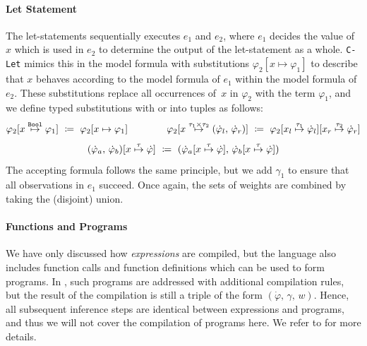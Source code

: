 \paragraph{Let Statement}
The let-statements sequentially executes $e_1$ and $e_2$, where $e_1$ decides the value of~$x$ which is used in $e_2$ to determine the output of the let-statement as a whole.
\texttt{C-Let} mimics this in the model formula with substitutions $\varphi_2[x\mapsto \varphi_1]$ to describe that $x$ behaves according to the model formula of $e_1$ within the model formula of $e_2$.
These substitutions replace all occurrences of~$x$ in $\varphi_2$ with the term $\varphi_1$, and we define typed substitutions with or into tuples as follows:
$$
\varphi_2 [x \overset{\texttt{Bool}}{\mapsto} \varphi_1] ~{}\coloneqq{}~ \varphi_2 [x \mapsto \varphi_1]
\qquad \qquad
\varphi_2 [x \overset{\tau_1 \times \tau_2}{\mapsto} (\dot{\varphi}_{l},\, \dot{\varphi}_{r})] ~{}\coloneqq{}~ \varphi_2 [x_l \overset{\tau_1}{\mapsto} \dot{\varphi}_{l}][x_r \overset{\tau_2}{\mapsto} \dot{\varphi}_{r}]$$ 
$$(\dot{\varphi}_a,\, \dot{\varphi}_b)[x\overset{\tau}{\mapsto}\dot{\varphi}] ~{}\coloneqq{}~ (\dot{\varphi}_a[x\overset{\tau}{\mapsto}\dot{\varphi}],\, \dot{\varphi}_b[x\overset{\tau}{\mapsto}\dot{\varphi}])$$
The accepting formula follows the same principle, but we add $\gamma_1$ to ensure that all observations in $e_1$ succeed.
Once again, the sets of weights are combined by taking the (disjoint) union.


\paragraph{Functions and Programs}
We have only discussed how \DICE \textit{expressions} are compiled, but the \DICE language also includes function calls and function definitions which can be used to form programs.
In \citet{holtzen2020scaling}, such \DICE programs are addressed with additional compilation rules, but the result of the compilation is still a triple of the form $(\dot{\varphi},\, \gamma,\, w)$.
Hence, all subsequent inference steps are identical between expressions and programs, and thus we will not cover the compilation of \DICE programs here.
We refer to \citet{holtzen2020scaling} for more details.




